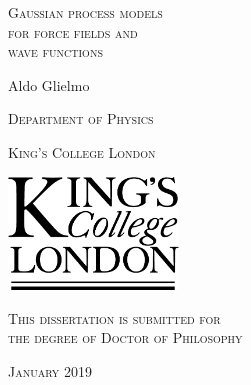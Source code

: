 


\thispagestyle{empty}

\begin{center}

{\textsc {\Huge Gaussian process models}}\\
%
\vspace{.15in}
%
{\textsc {\Huge for force fields and }}\\
%
\vspace{.15in}
%
{\textsc {\Huge wave functions}}
%
\vspace{1.5in}

{\Large Aldo Glielmo}

\vspace{.5in}

{\textsc {\large Department of Physics}}

\vspace{0.15in}

{\textsc {\large King's College London}}

\vspace{1.3in}
\includegraphics[height=3cm]{KCL_logo.pdf}

\vspace{1in}

{\textsc {\large This dissertation is submitted for \\ 
the degree of Doctor of Philosophy}}

\vspace{0.5in}

{\textsc {\large January 2019}}

\end{center}

\cleardoublepage

